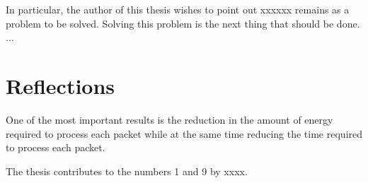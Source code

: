 \documentclass[../main.tex]{subfiles}
\begin{document}
In particular, the author of this thesis wishes to point out xxxxxx remains as a problem to be solved. Solving this problem is the next thing that should be done. ...

\section{Reflections}
\label{sec:reflections}



One of the most important results is the reduction in the amount of
energy required to process each packet while at the same time reducing the
time required to process each packet.

The thesis contributes to the  numbers 1 and 9 by
xxxx. 
\end{document}
